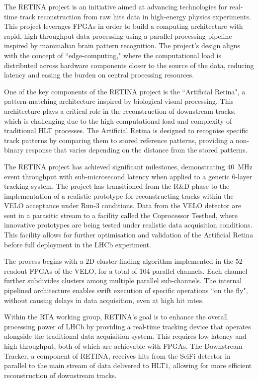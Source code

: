 The RETINA project\cite{Lazzari:2801062} is an initiative aimed at advancing technologies for real-time track reconstruction from raw hits data in high-energy physics experiments. This project leverages FPGAs in order to build a computing architecture with rapid, high-throughput data processing using a parallel processing pipeline inspired by mammalian brain pattern recognition. The project's design aligns with the concept of ``edge-computing," where the computational load is distributed across hardware components closer to the source of the data, reducing latency and easing the burden on central processing resources.


One of the key components of the RETINA project is the ``Artificial Retina"\cite{Ristori:2000vg}, a pattern-matching architecture inspired by biological visual processing. This architecture plays a critical role in the reconstruction of downstream tracks, which is challenging due to the high computational load and complexity of traditional HLT processes. The Artificial Retina is designed to recognise specific track patterns by comparing them to stored reference patterns, providing a non-binary response that varies depending on the distance from the stored patterns.

The RETINA project has achieved significant milestones, demonstrating \SI{40}{\mega\hertz} event throughput with sub-microsecond latency when applied to a generic 6-layer tracking system. The project has transitioned from the R\&D phase to the implementation of a realistic prototype for reconstructing tracks within the VELO acceptance under Run-3 conditions. Data from the VELO detector are sent in a parasitic stream to a facility called the Coprocessor Testbed, where innovative prototypes are being tested under realistic data acquisition conditions. This facility allows for further optimisation and validation of the Artificial Retina before full deployment in the LHCb experiment.

The process begins with a $2$D cluster-finding algorithm implemented in the 52 readout FPGAs of the VELO, for a total of 104 parallel channels. Each channel further subdivides clusters among multiple parallel sub-channels. The internal pipelined architecture enables swift execution of specific operations ``on the fly", without causing delays in data acquisition, even at high hit rates.

Within the RTA working group, RETINA’s goal is to enhance the overall processing power of LHCb by providing a real-time tracking device that operates alongside the traditional data acquisition system. This requires low latency and high throughput, both of which are achievable with FPGAs. The Downstream Tracker, a component of RETINA, receives hits from the SciFi detector in parallel to the main stream of data delivered to HLT$1$, allowing for more efficient reconstruction of downstream tracks.

